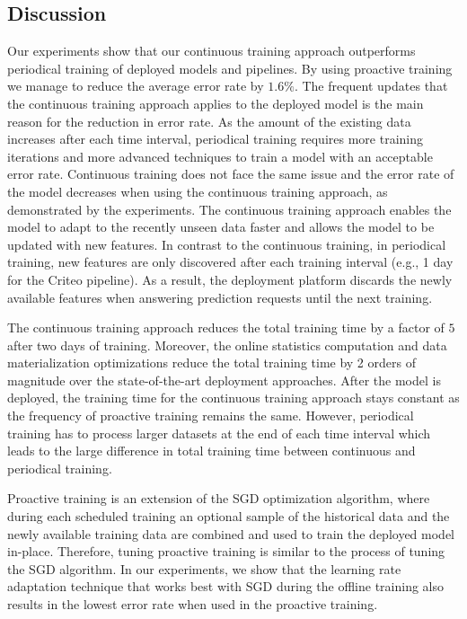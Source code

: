 \subsection{Discussion} \label{subsec:discussion}
Our experiments show that our continuous training approach outperforms periodical training of deployed models and pipelines.
By using proactive training we manage to reduce the average error rate by $1.6\%$.
The frequent updates that the continuous training approach applies to the deployed model is the main reason for the reduction in error rate.
As the amount of the existing data increases after each time interval, periodical training requires more training iterations and more advanced techniques to train a model with an acceptable error rate.
Continuous training does not face the same issue and the error rate of the model decreases when using the continuous training approach, as demonstrated by the experiments.
The continuous training approach enables the model to adapt to the recently unseen data faster and allows the model to be updated with new features.
In contrast to the continuous training, in periodical training, new features are only discovered after each training interval (e.g., 1 day for the Criteo pipeline).
As a result, the deployment platform discards the newly available features when answering prediction requests until the next training.

The continuous training approach reduces the total training time by a factor of $5$ after two days of training.
Moreover, the online statistics computation and data materialization optimizations reduce the total training time by 2 orders of magnitude over the state-of-the-art deployment approaches.
After the model is deployed, the training time for the continuous training approach stays constant as the frequency of proactive training remains the same.
However, periodical training has to process larger datasets at the end of each time interval which leads to the large difference in total training time between continuous and periodical training.

Proactive training is an extension of the SGD optimization algorithm, where during each scheduled training an optional sample of the historical data and the newly available training data are combined and used to train the deployed model in-place.
Therefore, tuning proactive training is similar to the process of tuning the SGD algorithm.
In our experiments, we show that the learning rate adaptation technique that works best with SGD during the offline training also results in the lowest error rate when used in the proactive training.

